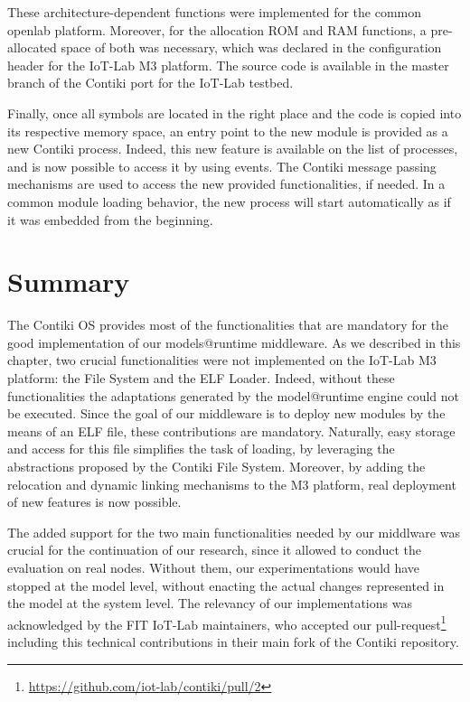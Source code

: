 These architecture-dependent functions were implemented for the common openlab platform.
Moreover, for the allocation ROM and RAM functions, a pre-allocated space of both was necessary, which was declared in the configuration header for the IoT-Lab M3 platform.
The source code is available in the master branch of the Contiki port for the IoT-Lab testbed.

Finally, once all symbols are located in the right place and the code is copied into its respective memory space, an entry point to the new module is provided as a new Contiki process.
Indeed, this new feature is available on the list of processes, and is now possible to access it by using events.
The Contiki message passing mechanisms are used to access the new provided functionalities, if needed.
In a common module loading behavior, the new process will start automatically as if it was embedded from the beginning.

\section{Summary}
The Contiki OS provides most of the functionalities that are mandatory for the good implementation of our models@runtime middleware.
As we described in this chapter, two crucial functionalities were not implemented on the IoT-Lab M3 platform: the File System and the ELF Loader.
Indeed, without these functionalities the adaptations generated by the model@runtime engine could not be executed.
Since the goal of our middleware is to deploy new modules by the means of an ELF file, these contributions are mandatory.
Naturally, easy storage and access for this file simplifies the task of loading, by leveraging the abstractions proposed by the Contiki File System.
Moreover, by adding the relocation and dynamic linking mechanisms to the M3 platform, real deployment of new features is now possible.

The added support for the two main functionalities needed by our middlware was crucial for the continuation of our research, since it allowed to conduct the evaluation on real nodes.
Without them, our experimentations would have stopped at the model level, without enacting the actual changes represented in the model at the system level.
The relevancy of our implementations was acknowledged by the FIT IoT-Lab maintainers, who accepted our pull-request\footnote{\url{https://github.com/iot-lab/contiki/pull/2}} including this technical contributions in their main fork of the Contiki repository.

